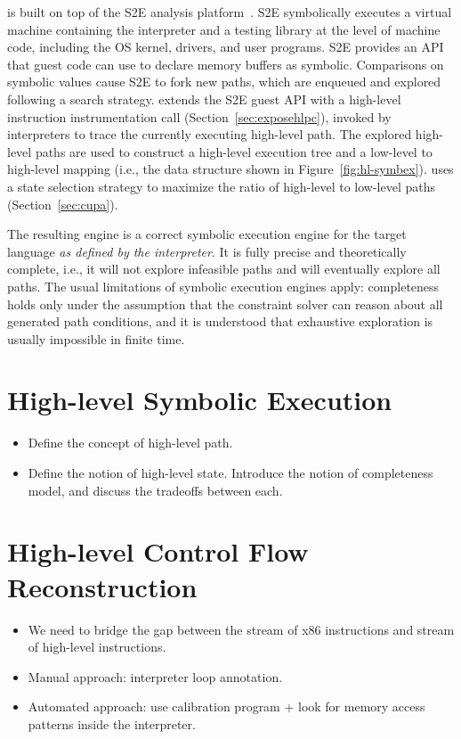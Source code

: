 \chef is built on top of the S2E analysis platform~\cite{s2eSystem}. S2E symbolically executes a virtual machine containing the interpreter and a testing library at the level of machine code,  including the OS kernel, drivers, and user programs.  S2E provides an API that guest code can use to declare memory buffers as symbolic. Comparisons on symbolic values cause S2E to fork new paths, which are enqueued and explored following a search strategy.
%
\chef extends the S2E guest API with a high-level instruction instrumentation call (Section~\ref{sec:exposehlpc}), invoked by interpreters to trace the currently executing high-level path.  The explored high-level paths are used to construct a high-level execution tree and a low-level to high-level mapping (i.e., the data structure shown in Figure~\ref{fig:hl-symbex}).  \chef uses a state selection strategy to maximize the ratio of high-level to low-level paths (Section~\ref{sec:cupa}).

The resulting engine is a correct symbolic execution engine for the target language \textit{as defined by the interpreter}. It is fully precise and theoretically complete, i.e., it will not explore infeasible paths and will eventually explore all paths. The usual limitations of symbolic execution engines apply: completeness holds only under the assumption that the constraint solver can reason about all generated path conditions, and it is understood that exhaustive exploration is usually impossible in finite time.


\section{High-level Symbolic Execution}
\begin{itemize}
\item Define the concept of high-level path.
\item Define the notion of high-level state.  Introduce the notion of completeness model, and discuss the tradeoffs between each.
\end{itemize}


\section{High-level Control Flow Reconstruction}
\begin{itemize}
\item We need to bridge the gap between the stream of x86 instructions and stream of high-level instructions.
\item Manual approach: interpreter loop annotation.
\item Automated approach: use calibration program + look for memory access patterns inside the interpreter.
\end{itemize}

